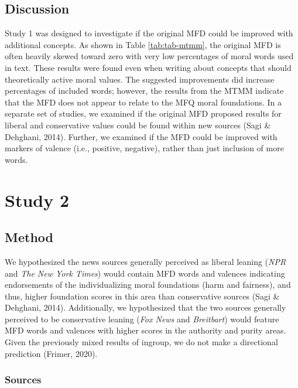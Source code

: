\documentclass[
  man,floatsintext]{apa6}
\begin{document}
\subsection{Discussion}\label{discussion}

Study 1 was designed to investigate if the original MFD could be improved with additional concepts. As shown in Table \ref{tab:tab-mtmm}, the original MFD is often heavily skewed toward zero with very low percentages of moral words used in text. These results were found even when writing about concepts that should theoretically active moral values. The suggested improvements did increase percentages of included words; however, the results from the MTMM indicate that the MFD does not appear to relate to the MFQ moral foundations. In a separate set of studies, we examined if the original MFD proposed results for liberal and conservative values could be found within new sources (Sagi \& Dehghani, 2014). Further, we examined if the MFD could be improved with markers of valence (i.e., positive, negative), rather than just inclusion of more words.

\section{Study 2}\label{study-2}

\subsection{Method}\label{method-1}

We hypothesized the news sources generally perceived as liberal leaning
(\emph{NPR} and \emph{The New York Times}) would contain MFD words and valences
indicating endorsements of the individualizing moral foundations
(harm and fairness), and thus, higher foundation scores in this area than conservative sources (Sagi \& Dehghani, 2014). Additionally, we hypothesized that the two sources generally perceived to be conservative leaning (\emph{Fox News} and \emph{Breitbart}) would feature MFD words and valences with higher scores in the authority and purity areas. Given the previously mixed results of ingroup, we do not make a directional prediction (Frimer, 2020).

\subsubsection{Sources}\label{sources}
\end{document}
